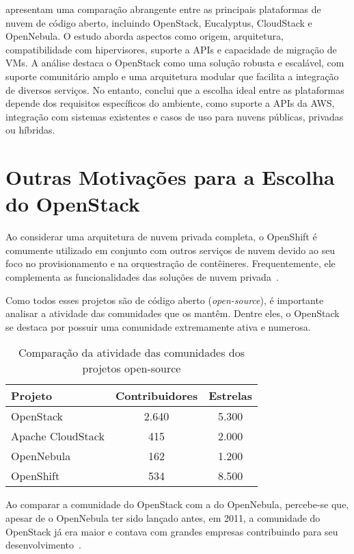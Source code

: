 \cite{kumar2014open} apresentam uma comparação abrangente entre as principais plataformas de nuvem de código aberto, incluindo OpenStack, Eucalyptus, CloudStack e OpenNebula. O estudo aborda aspectos como origem, arquitetura, compatibilidade com hipervisores, suporte a APIs e capacidade de migração de VMs. A análise destaca o OpenStack como uma solução robusta e escalável, com suporte comunitário amplo e uma arquitetura modular que facilita a integração de diversos serviços. No entanto, conclui que a escolha ideal entre as plataformas depende dos requisitos específicos do ambiente, como suporte a APIs da AWS, integração com sistemas existentes e casos de uso para nuvens públicas, privadas ou híbridas.



\section{Outras Motivações para a Escolha do OpenStack}

Ao considerar uma arquitetura de nuvem privada completa, o OpenShift é comumente utilizado em conjunto com outros serviços de nuvem devido ao seu foco no provisionamento e na orquestração de contêineres. Frequentemente, ele complementa as funcionalidades das soluções de nuvem privada~\citep{IBMWithOpenShift}.

Como todos esses projetos são de código aberto (\textit{open-source}), é importante analisar a atividade das comunidades que os mantêm. Dentre eles, o OpenStack se destaca por possuir uma comunidade extremamente ativa e numerosa.

\begin{table}[htbp]
    \centering
    \caption{Comparação da atividade das comunidades dos projetos open-source}
    \label{tab:comunidade_projetos}
    \begin{tabular}{|l|c|c|}
        \hline
        \textbf{Projeto} & \textbf{Contribuidores} & \textbf{Estrelas} \\ \hline
        OpenStack & 2.640 & 5.300 \\ \hline
        Apache CloudStack & 415 & 2.000 \\ \hline
        OpenNebula & 162 & 1.200 \\ \hline
        OpenShift & 534 & 8.500 \\ \hline
    \end{tabular}
\end{table}

Ao comparar a comunidade do OpenStack com a do OpenNebula, percebe-se que, apesar de o OpenNebula ter sido lançado antes, em 2011, a comunidade do OpenStack já era maior e contava com grandes empresas contribuindo para seu desenvolvimento~\citep{wen2012comparison}.


